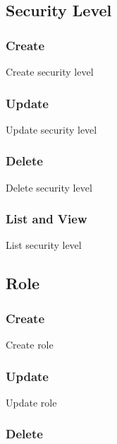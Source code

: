 \subsection{Security Level}
\label{ch:result:user_guide:security_level}
\subsubsection{Create}
\label{ch:result:user_guide:security_level:create}

Create security level

\subsubsection{Update}
\label{ch:result:user_guide:security_level:update}

Update security level

\subsubsection{Delete}
\label{ch:result:user_guide:security_level:delete}

Delete security level

\subsubsection{List and View}
\label{ch:result:user_guide:security_level:list}

List security level

\subsection{Role}
\label{ch:result:user_guide:role}
\subsubsection{Create}
\label{ch:result:user_guide:role:create}

Create role

\subsubsection{Update}
\label{ch:result:user_guide:role:update}

Update role

\subsubsection{Delete}
\label{ch:result:user_guide:role:delete}

